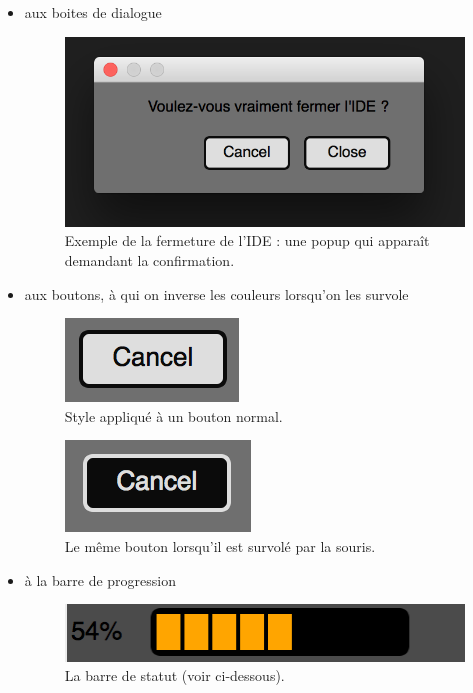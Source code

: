 \documentclass[a4paper,12pt]{article}
\begin{document}
		\begin{itemize}
			\item aux boites de dialogue
				\begin{figure}[h!]
					\begin{center}
						\includegraphics[scale=0.4]{images/imgs_themes/quit}
						\caption{ Exemple de la fermeture de l'IDE : une popup qui apparaît demandant la confirmation.}
					\end{center}
				\end{figure}
				
			\item aux boutons, à qui on inverse les couleurs lorsqu'on les survole
				\begin{figure}[h!]
					\begin{center}
						\includegraphics[scale=1]{images/imgs_themes/bout1}
						\caption{Style appliqué à un bouton normal.}
					\end{center}
				\end{figure}
				\begin{figure}[h!]
					\begin{center}
						\includegraphics[scale=1]{images/imgs_themes/bout2}
						\caption{Le même bouton lorsqu'il est survolé par la souris.}
					\end{center}
				\end{figure}
				
				\newpage
			\item à la barre de progression
			\begin{figure}[h!]
					\begin{center}
						\includegraphics[scale=0.7]{images/imgs_themes/progress2}
						\caption{La barre de statut (voir ci-dessous).}
					\end{center}
				\end{figure}
		\end{itemize}
		
\end{document}
